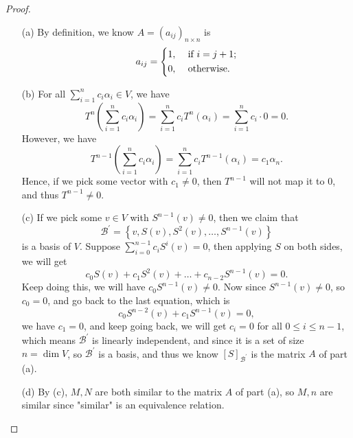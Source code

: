 \begin{proof}
    \vphantom{text}
    \begin{itemize}
        \item [(a)] By definition, we know \(A = (a_{ij})_{n \times n}\) is 
        \[
            a_{ij} = \begin{dcases}
                1, &\text{ if }  i = j + 1;\\
                0, &\text{ otherwise}.
            \end{dcases}
        \]
        \item [(b)] For all \(\sum_{i=1}^n c_i \alpha _i \in V\), we have 
        \[
            T^n \left( \sum_{i=1}^n c_i \alpha _i  \right) = \sum_{i=1}^n c_i T^n(\alpha _i) = \sum_{i=1}^n c_i \cdot 0 = 0.  
        \]
        However, we have 
        \[
            T^{n-1} \left( \sum_{i=1}^n c_i \alpha _i  \right) = \sum_{i=1}^n c_i T^{n-1}(\alpha _i) = c_1 \alpha _n.  
        \]Hence, if we pick some vector with \(c_1 \neq 0\), then \(T^{n-1}\) will not map it to \(0\), and thus \(T^{n-1} \neq 0\). 
        \item [(c)] If we pick some \(v \in V\) with \(S^{n-1}(v) \neq 0\), then we claim that 
        \[
            \mathcal{B} ^{\prime} = \left\{ v, S(v), S^2(v), \dots , S^{n-1}(v) \right\} 
        \] is a basis of \(V\). Suppose \(\sum_{i=0}^{n-1} c_i S^{i}(v) = 0 \), then applying \(S\) on both sides, we will get 
        \[
            c_0 S(v) + c_1 S^2(v) + \dots + c_{n-2} S^{n-1}(v) = 0.
        \]Keep doing this, we will have \(c_0 S^{n-1}(v) \neq 0\). Now since \(S^{n-1}(v) \neq 0\), so \(c_0 = 0\), and go back to the last equation, which is 
        \[
            c_0 S^{n-2}(v) + c_1 S^{n-1}(v) = 0,
        \] we have \(c_1 = 0\), and keep going back, we will get \(c_i = 0\) for all \(0 \le i \le n - 1\), which means \(\mathcal{B} ^{\prime} \) is linearly independent, and since it is a set of size \(n = \dim V\), so \(\mathcal{B} ^{\prime} \) is a basis, and thus we know \([S]_{\mathcal{B} ^{\prime} }\) is the matrix \(A\) of part (a). 
        \item [(d)] By (c), \(M, N\) are both similar to the matrix \(A\) of part (a), so \(M, n\) are similar since "similar" is an equivalence relation.         
    \end{itemize}
\end{proof}